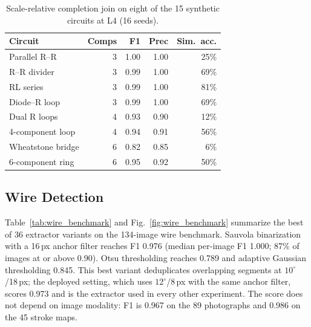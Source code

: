 \documentclass{ieeeaccess}
\begin{document}
\begin{table}[!t]
\caption{Scale-relative completion join on eight of the 15 synthetic circuits at L4 (16 seeds).}
\label{tab:per_circuit}
\centering
\footnotesize
\begin{tabular}{lrrrr}
\toprule
\textbf{Circuit} & \textbf{Comps} & \textbf{F1} & \textbf{Prec} & \textbf{Sim.\ acc.} \\
\midrule
Parallel R--R & 3 & 1.00 & 1.00 & 25\% \\
R--R divider & 3 & 0.99 & 1.00 & 69\% \\
RL series & 3 & 0.99 & 1.00 & 81\% \\
Diode--R loop & 3 & 0.99 & 1.00 & 69\% \\
Dual R loops & 4 & 0.93 & 0.90 & 12\% \\
4-component loop & 4 & 0.94 & 0.91 & 56\% \\
Wheatstone bridge & 6 & 0.82 & 0.85 & 6\% \\
6-component ring & 6 & 0.95 & 0.92 & 50\% \\
\bottomrule
\end{tabular}
\end{table}

\subsection{Wire Detection}

Table~\ref{tab:wire_benchmark} and Fig.~\ref{fig:wire_benchmark} summarize the best of 36 extractor variants on the 134-image wire benchmark. Sauvola binarization with a 16\,px anchor filter reaches F1 0.976 (median per-image F1 1.000; 87\% of images at or above 0.90). Otsu thresholding reaches 0.789 and adaptive Gaussian thresholding 0.845. This best variant deduplicates overlapping segments at $10^{\circ}$/18\,px; the deployed setting, which uses $12^{\circ}$/8\,px with the same anchor filter, scores 0.973 and is the extractor used in every other experiment. The score does not depend on image modality: F1 is 0.967 on the 89 photographs and 0.986 on the 45 stroke maps.
\end{document}
